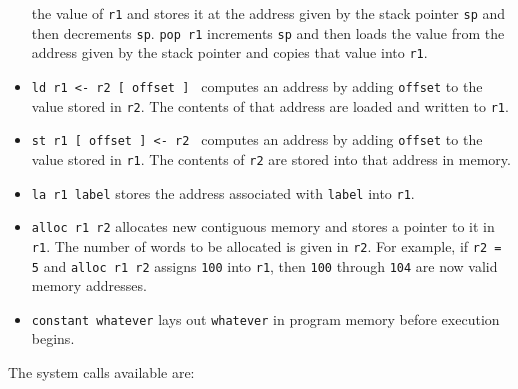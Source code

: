 \documentclass[]{article}
\begin{document}
\begin{itemize}
  the value of \texttt{r1} and stores it at the address given by the
  stack pointer \texttt{sp} and then decrements \texttt{sp}.
  \texttt{pop   r1} increments \texttt{sp} and then loads the value from
  the address given by the stack pointer and copies that value into
  \texttt{r1}.
\item
  \texttt{ld r1 \textless{}- r2 {[} offset {]} } computes an address by
  adding \texttt{offset} to the value stored in \texttt{r2}. The
  contents of that address are loaded and written to \texttt{r1}.
\item
  \texttt{st r1 {[} offset {]} \textless{}- r2 } computes an address by
  adding \texttt{offset} to the value stored in \texttt{r1}. The
  contents of \texttt{r2} are stored into that address in memory.
\item
  \texttt{la r1 label} stores the address associated with \texttt{label}
  into \texttt{r1}.
\item
  \texttt{alloc r1 r2} allocates new contiguous memory and stores a
  pointer to it in \texttt{r1}. The number of words to be allocated is
  given in \texttt{r2}. For example, if \texttt{r2 = 5} and
  \texttt{alloc r1   r2} assigns \texttt{100} into \texttt{r1}, then
  \texttt{100} through \texttt{104} are now valid memory addresses.
\item
  \texttt{constant whatever} lays out \texttt{whatever} in program
  memory before execution begins.
\end{itemize}

The system calls available are:
\end{document}
